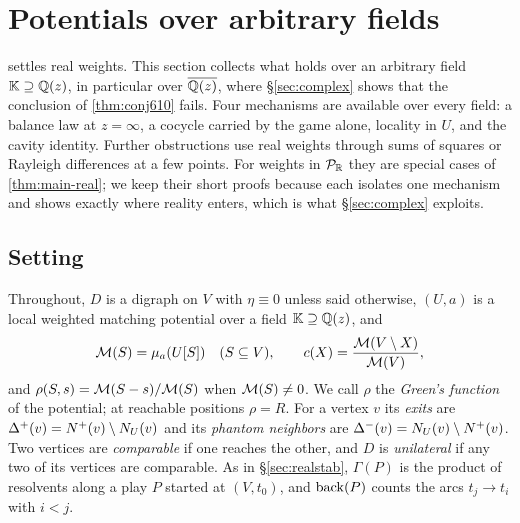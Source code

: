 \section{Potentials over arbitrary fields}\label{sec:fields}

 settles real weights. This section collects what holds over an arbitrary field $\mathbb K\supseteq\Qz$, in particular over $\Qzbar$, where \S\ref{sec:complex} shows that the conclusion of \cref{thm:conj610} fails. Four mechanisms are available over every field: a balance law at $z=\infty$, a cocycle carried by the game alone, locality in $U$, and the cavity identity. Further obstructions use real weights through sums of squares or Rayleigh differences at a few points. For weights in $\Puis$ they are special cases of \cref{thm:main-real}; we keep their short proofs because each isolates one mechanism and shows exactly where reality enters, which is what \S\ref{sec:complex} exploits.

\subsection{Setting}\label{ssec:fields-setting}
Throughout, $D$ is a digraph on $V$ with $\eta\equiv0$ unless said otherwise, $(U,a)$ is a local weighted matching potential over a field $\mathbb K\supseteq\Qz$, and
\[
\Mpot(S)=\mu_a(U[S])\quad(S\subseteq V),\qquad c(X)=\frac{\Mpot(V\setminus X)}{\Mpot(V)},
\]
and $\rho(S,s)=\Mpot(S-s)/\Mpot(S)$ when $\Mpot(S)\neq0$.
We call $\rho$ the \emph{Green's function} of the potential; at reachable positions $\rho=R$. For a vertex $v$ its \emph{exits} are $\Delta^{+}(v)=\nplus(v)\setminus N_U(v)$ and its \emph{phantom neighbors} are $\Delta^{-}(v)=N_U(v)\setminus\nplus(v)$. Two vertices are \emph{comparable} if one reaches the other, and $D$ is \emph{unilateral} if any two of its vertices are comparable. As in \S\ref{sec:realstab}, $\Gamma(P)$ is the product of resolvents along a play $P$ started at $(V,t_0)$, and $\back(P)$ counts the arcs $t_j\to t_i$ with $i<j$.

